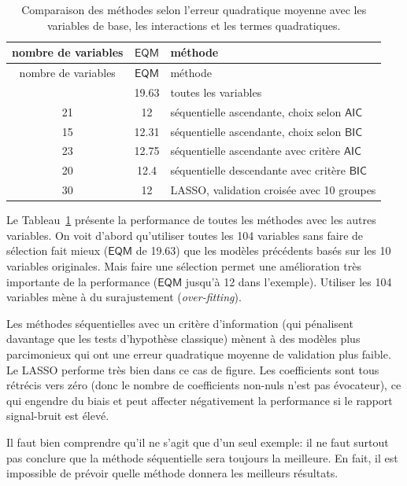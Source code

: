 \documentclass[
  11pt,
  letterpaper,
]{scrbook}
\theoremstyle{definition}
\theoremstyle{remark}
\begin{document}
\hypertarget{tbl-02-modelcomparaisonfull}{}
\begin{longtable}[]{@{}ccl@{}}
\caption{\label{tbl-02-modelcomparaisonfull}Comparaison des méthodes
selon l'erreur quadratique moyenne avec les variables de base, les
interactions et les termes quadratiques.}\tabularnewline
\toprule\noalign{}
nombre de variables & \(\mathsf{EQM}\) & méthode \\
\midrule\noalign{}
\endfirsthead
\toprule\noalign{}
nombre de variables & \(\mathsf{EQM}\) & méthode \\
\midrule\noalign{}
\endhead
\bottomrule\noalign{}
\endlastfoot
104 & 19.63 & toutes les variables \\
21 & 12 & séquentielle ascendante, choix selon \(\mathsf{AIC}\) \\
15 & 12.31 & séquentielle ascendante, choix selon \(\mathsf{BIC}\) \\
23 & 12.75 & séquentielle ascendante avec critère \(\mathsf{AIC}\) \\
20 & 12.4 & séquentielle descendante avec critère \(\mathsf{BIC}\) \\
30 & 12 & LASSO, validation croisée avec 10 groupes \\
\end{longtable}

Le Tableau~\ref{tbl-02-modelcomparaisonfull} présente la performance de
toutes les méthodes avec les autres variables. On voit d'abord
qu'utiliser toutes les 104 variables sans faire de sélection fait mieux
(\(\mathsf{EQM}\) de 19.63) que les modèles précédents basés sur les 10
variables originales. Mais faire une sélection permet une amélioration
très importante de la performance (\(\mathsf{EQM}\) jusqu'à 12 dans
l'exemple). Utiliser les 104 variables mène à du surajustement
(\emph{over-fitting}).

Les méthodes séquentielles avec un critère d'information (qui pénalisent
davantage que les tests d'hypothèse classique) mènent à des modèles plus
parcimonieux qui ont une erreur quadratique moyenne de validation plus
faible. Le LASSO performe très bien dans ce cas de figure. Les
coefficients sont tous rétrécis vers zéro (donc le nombre de
coefficients non-nuls n'est pas évocateur), ce qui engendre du biais et
peut affecter négativement la performance si le rapport signal-bruit est
élevé.

Il faut bien comprendre qu'il ne s'agit que d'un seul exemple: il ne
faut surtout pas conclure que la méthode séquentielle sera toujours la
meilleure. En fait, il est impossible de prévoir quelle méthode donnera
les meilleurs résultats.
\end{document}
